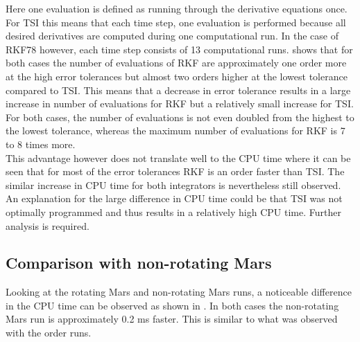 Here one evaluation is defined as running through the derivative equations once. For \ac{TSI} this means that each time step, one evaluation is performed because all desired derivatives are computed during one computational run. In the case of \ac{RKF78} however, each time step consists of 13 computational runs.  shows that for both cases the number of evaluations of \ac{RKF} are approximately one order more at the high error tolerances but almost two orders higher at the lowest tolerance compared to \ac{TSI}. This means that a decrease in error tolerance results in a large increase in number of evaluations for \ac{RKF} but a relatively small increase for \ac{TSI}. For both cases, the number of evaluations is not even doubled from the highest to the lowest tolerance, whereas the maximum number of evaluations for \ac{RKF} is 7 to 8 times more. \\

This advantage however does not translate well to the CPU time where it can be seen that for most of the error tolerances \ac{RKF} is an order faster than \ac{TSI}. The similar increase in CPU time for both integrators is nevertheless still observed. An explanation for the large difference in CPU time could be that \ac{TSI} was not optimally programmed and thus results in a relatively high CPU time. Further analysis is required.


%


\subsection{Comparison with non-rotating Mars}
\label{subsec:errorToleranceCompNotRot}
Looking at the rotating Mars and non-rotating Mars runs, a noticeable difference in the CPU time can be observed as shown in . In both cases the non-rotating Mars run is approximately 0.2 ms faster. This is similar to what was observed with the order runs.




